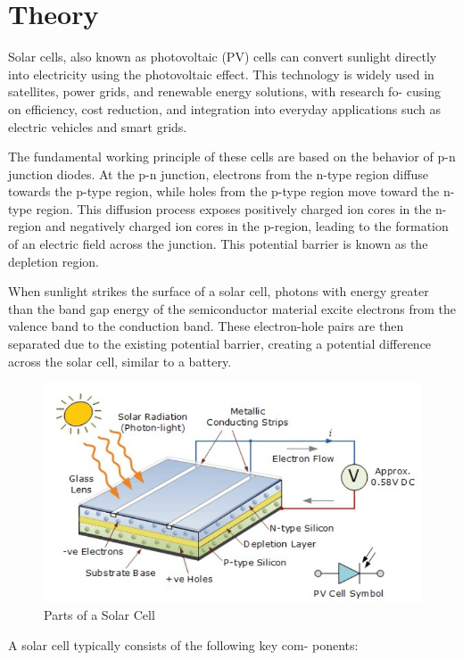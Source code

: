 \section{Theory}

Solar cells, also known as photovoltaic (PV) cells can convert sunlight directly into electricity using
the photovoltaic effect. 
This technology is widely used in satellites, power
grids, and renewable energy solutions, with research fo-
cusing on efficiency, cost reduction, and integration into
everyday applications such as electric vehicles and smart
grids.

The fundamental working principle of these cells are based on the behavior of p-n junction diodes. 
At the p-n junction, electrons from the n-type region diffuse towards the
p-type region, while holes from the p-type region move
toward the n-type region. This diffusion process exposes
positively charged ion cores in the n-region and negatively charged ion cores in the p-region, leading to the
formation of an electric field across the junction. This potential barrier is known as the depletion region.

When sunlight
strikes the surface of a solar cell, photons with energy greater than the band gap energy of the semiconductor material excite
electrons from the valence band to the conduction band. These electron-hole pairs are then separated due to the existing potential barrier, creating a potential difference
across the solar cell, similar to a battery.

\begin{figure}
    \centering
    \includegraphics[width=1\columnwidth]{images/scheme.png}
    \caption{Parts of a Solar Cell}
\end{figure}

A solar cell typically consists of the following key com-
ponents:\\

